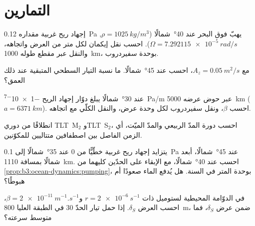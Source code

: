 \section{التمارين}

\begin{exercise}[$\star$]\label{exo:b3:ocean-dynamics:1}
إجهاد ريح غربية مقداره \qty{0.12}{Pa} يهبّ فوق البحر عند \ang{40}~شمالًا
($\rho = \qty{1025}{kg/m^3}$, $\Omega = \qty{7.292115e-5}{rad/s}$).
احسب نقل إيكمان لكل متر من العرض واتجاهه،
والنقل عبر مقطع طوله \qty{1000}{km}، بوحدة سفيردروب.
\end{exercise}

\begin{exercise}[$\star$]\label{exo:b3:ocean-dynamics:2}
مع $A_z = \qty{0.05}{m^2/s}$، احسب  عند \ang{45}~شمالًا. ما
نسبة التيار السطحي المتبقية عند ذلك العمق؟
\end{exercise}

\begin{exercise}[$\star$]\label{exo:b3:ocean-dynamics:3}
عند \ang{30}~شمالًا يبلغ دوّار إجهاد الريح \qty{-1e-7}{Pa/m} عبر حوض
عرضه \qty{5000}{km} ($a = \qty{6371}{km}$). احسب $\beta$،
ونقل سفيردروب لكل وحدة عرض، والنقل الكلّي
مع اتجاهه.
\end{exercise}

\begin{exercise}[$\star$]\label{exo:b3:ocean-dynamics:4}
انطلاقًا من دوري \mbox{\textdir TLT M$_2$} و\mbox{\textdir TLT S$_2$}، احسب دورة
المدّ الربيعي والمدّ الميّت، أي الزمن الفاصل بين اصطفافين
متتاليين للمكوّنين.
\end{exercise}

\begin{exercise}[$\star\star$]\label{exo:b3:ocean-dynamics:5}
يتزايد إجهاد ريح غربية خطّيًّا من 0 عند \ang{35}~شمالًا إلى \qty{0.1}{Pa} عند
\ang{45}~شمالًا، أبعد شمالًا بمسافة \qty{1110}{km}. احسب  عند
\ang{40}~شمالًا، مع الإبقاء على الحدّين كليهما من \cref{prop:b3:ocean-dynamics:pumping}،
بوحدة المتر في السنة. هل يُدفع الماء صعودًا أم هبوطًا؟
\end{exercise}

\begin{exercise}[$\star\star$]\label{exo:b3:ocean-dynamics:6}
في الدوّامة المحيطية لستوميل ذات $r = \qty{2e-6}{s^{-1}}$ و$\beta =
\qty{2e-11}{m^{-1}.s^{-1}}$، احسب العرض $\delta_S$. إذا حمل تيار الحدّ
\qty{30}{\sverdrup} في الطبقة العليا \qty{800}{m}، ضمن عرض
$\delta_S$، فما متوسط سرعته؟
\end{exercise}

